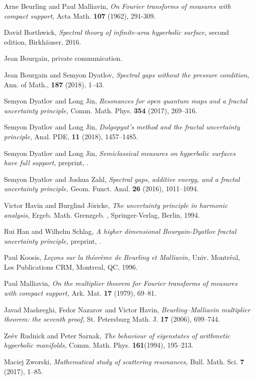 \documentclass[reqno,12pt,letterpaper]{amsart}
\numberwithin{equation}{section}
\numberwithin{prop}{section}
\begin{document}
\begin{thebibliography}{0}

 Arne Beurling and Paul Malliavin,
	\emph{On Fourier transforms of measures with compact support,\/}
	Acta Math. \textbf{107} (1962), 291-309.

 David Borthwick,
	\emph{Spectral theory of infinite-area hyperbolic surface,\/}
	second edition, Birkh\"{a}user, 2016.
	
 Jean Bourgain, private communication.

 Jean Bourgain and Semyon Dyatlov,
	\emph{Spectral gaps without the pressure condition,\/}
	Ann. of Math., \textbf{187} (2018), 1--43.
	
 Semyon Dyatlov and Long Jin,
	\emph{Resonances for open quantum maps and a fractal uncertainty principle,\/}
	Comm. Math. Phys. \textbf{354} (2017), 269--316.
	
 Semyon Dyatlov and Long Jin,
	\emph{Dolgopyat's method and the fractal uncertainty principle,\/}
	Anal. PDE, \textbf{11} (2018), 1457--1485.
	
 Semyon Dyatlov and Long Jin,
	\emph{Semiclassical measures on hyperbolic surfaces have full support,\/}
	preprint, .
	
 Semyon Dyatlov and Joshua Zahl,
	\emph{Spectral gaps, additive energy, and a fractal uncertainty principle,\/}
	Geom. Funct. Anal. \textbf{26} (2016), 1011--1094.
	
 Victor Havin and Burglind J\"{o}ricke,
	\emph{The uncertainty principle in harmonic analysis,\/}
	Ergeb. Math. Grenzgeb. , Springer-Verlag, Berlin, 1994.
	
 Rui Han and Wilhelm Schlag,
	\emph{A higher dimensional Bourgain-Dyatlov fractal uncertainty principle,\/}
	preprint, .
	
 Paul Koosis, 
	\emph{Le\c{c}ons sur la th\'{e}or\`{e}me de Beurling et Malliavin,\/}
	Univ. Montr\'{e}al, Les Publications CRM, Montreal, QC, 1996.
	
 Paul Malliavin,
	\emph{On the multiplier theorem for Fourier transforms of measures with compact support,\/}
	Ark. Mat. \textbf{17} (1979), 69--81.

 Javad Mashreghi, Fedor Nazarov and Victor Havin,
	\emph{Beurling--Malliavin multiplier theorem: the seventh proof,\/}
	St. Petersburg Math. J. \textbf{17} (2006), 699--744.

 Ze\'ev Rudnick and Peter Sarnak,
	\emph{The behaviour of eigenstates of arithmetic hyperbolic manifolds,\/}
	Comm. Math. Phys. \textbf{161}(1994), 195--213.
	
 Maciej Zworski,
	\emph{Mathematical study of scattering resonances,\/}
	Bull. Math. Sci. \textbf{7} (2017), 1--85.

\end{thebibliography}
\end{document}
